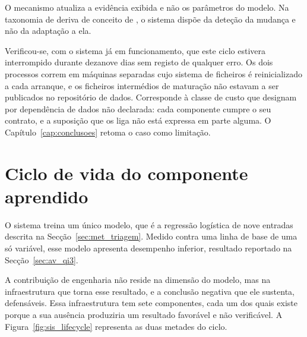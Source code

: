 O mecanismo atualiza a evidência exibida e não os parâmetros do modelo. Na taxonomia de deriva de
conceito de \textcite{gama2014survey}, o sistema dispõe da deteção da mudança e não da adaptação a
ela.

Verificou-se, com o sistema já em funcionamento, que este ciclo estivera interrompido durante
dezanove dias sem registo de qualquer erro. Os dois processos correm em máquinas separadas cujo
sistema de ficheiros é reinicializado a cada arranque, e os ficheiros intermédios de maturação não
estavam a ser publicados no repositório de dados. Corresponde à classe de custo que
\textcite{sculley2015debt} designam por dependência de dados não declarada: cada componente cumpre
o seu contrato, e a suposição que os liga não está expressa em parte alguma. O
Capítulo~\ref{cap:conclusoes} retoma o caso como limitação.

\section{Ciclo de vida do componente aprendido}
\label{sec:sis_ciclo}

O sistema treina um único modelo, que é a regressão logística de nove entradas descrita na
Secção~\ref{sec:met_triagem}. Medido contra uma linha de base de uma só variável, esse modelo
apresenta desempenho inferior, resultado reportado na Secção~\ref{sec:av_qi3}.

A contribuição de engenharia não reside na dimensão do modelo, mas na infraestrutura que torna
esse resultado, e a conclusão negativa que ele sustenta, defensáveis. Essa infraestrutura tem sete
componentes, cada um dos quais existe porque a sua ausência produziria um resultado favorável e
não verificável. A Figura~\ref{fig:sis_lifecycle} representa as duas metades do ciclo.

